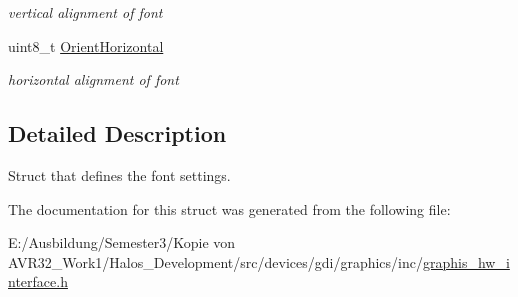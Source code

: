 \begin{CompactItemize}
\begin{CompactList}\small\item\em vertical alignment of font \item\end{CompactList}\item 
\hypertarget{struct_font_settings__t_79117bfe6b12b78a914e6cf89aaf0ea5}{
uint8\_\-t \hyperlink{struct_font_settings__t_79117bfe6b12b78a914e6cf89aaf0ea5}{OrientHorizontal}}
\label{struct_font_settings__t_79117bfe6b12b78a914e6cf89aaf0ea5}

\begin{CompactList}\small\item\em horizontal alignment of font \item\end{CompactList}\end{CompactItemize}


\subsection{Detailed Description}
Struct that defines the font settings. 

The documentation for this struct was generated from the following file:\begin{CompactItemize}
\item 
E:/Ausbildung/Semester3/Kopie von AVR32\_\-Work1/Halos\_\-Development/src/devices/gdi/graphics/inc/\hyperlink{graphis__hw__interface_8h}{graphis\_\-hw\_\-interface.h}\end{CompactItemize}
